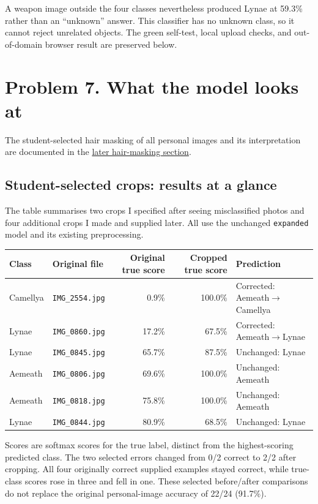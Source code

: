 \documentclass[11pt]{article}
\begin{document}
A weapon image outside the four classes nevertheless produced Lynae at 59.3\% rather than an ``unknown'' answer. This classifier has no unknown class, so it cannot reject unrelated objects. The green self-test, local upload checks, and out-of-domain browser result are preserved below.
\par\noindent {}\par
\par\noindent {}\par

\section*{Problem 7. What the model looks at}
The student-selected hair masking of all personal images and its interpretation are documented in the \hyperref[sec:student-hair]{later hair-masking section}.
\subsection*{Student-selected crops: results at a glance}
The table summarises two crops I specified after seeing misclassified photos and four additional crops I made and supplied later. All use the unchanged \texttt{expanded} model and its existing preprocessing.
\begin{center}\small
\setlength{\tabcolsep}{4pt}
\begin{tabular}{llrrl}
\toprule
Class & Original file & Original true score & Cropped true score & Prediction \\
\midrule
Camellya & \texttt{IMG\_2554.jpg} & 0.9\% & 100.0\% & Corrected: Aemeath$\to$Camellya \\
Lynae & \texttt{IMG\_0860.jpg} & 17.2\% & 67.5\% & Corrected: Aemeath$\to$Lynae \\
Lynae & \texttt{IMG\_0845.jpg} & 65.7\% & 87.5\% & Unchanged: Lynae \\
Aemeath & \texttt{IMG\_0806.jpg} & 69.6\% & 100.0\% & Unchanged: Aemeath \\
Aemeath & \texttt{IMG\_0818.jpg} & 75.8\% & 100.0\% & Unchanged: Aemeath \\
Lynae & \texttt{IMG\_0844.jpg} & 80.9\% & 68.5\% & Unchanged: Lynae \\
\bottomrule
\end{tabular}
\end{center}
Scores are softmax scores for the true label, distinct from the highest-scoring predicted class. The two selected errors changed from 0/2 correct to 2/2 after cropping. All four originally correct supplied examples stayed correct, while true-class scores rose in three and fell in one. These selected before/after comparisons do not replace the original personal-image accuracy of 22/24 (91.7\%).
\end{document}
